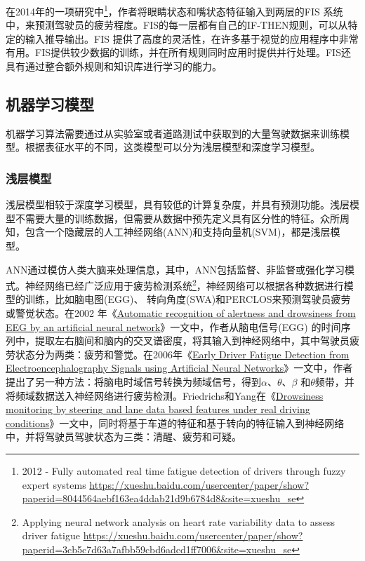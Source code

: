 在2014年的一项研究中\footnote{2012 - Fully automated real time
fatigue detection of drivers through fuzzy expert systems \quad \url{https://xueshu.baidu.com/usercenter/paper/show?paperid=8044564aebf163ea4ddab21d9b6784d8&site=xueshu_se}}，作者将眼睛状态和嘴状态特征输入到两层的FIS 系统中，来预测驾驶员的疲劳程度。FIS的每一层都有自己的IF-THEN规则，可以从特定的输入推导输出。FIS 提供了高度的灵活性，在许多基于视觉的应用程序中非常有用。FIS提供较少数据的训练，并在所有规则同时应用时提供并行处理。FIS还具有通过整合额外规则和知识库进行学习的能力。



\subsection{机器学习模型}
机器学习算法需要通过从实验室或者道路测试中获取到的大量驾驶数据来训练模型。根据表征水平的不同，这类模型可以分为浅层模型和深度学习模型。

\subsubsection{浅层模型}

浅层模型相较于深度学习模型，具有较低的计算复杂度，并具有预测功能。浅层模型不需要大量的训练数据，但需要从数据中预先定义具有区分性的特征。众所周知，包含一个隐藏层的人工神经网络(ANN)和支持向量机(SVM)，都是浅层模型。

ANN通过模仿人类大脑来处理信息，其中，ANN包括监督、非监督或强化学习模式。神经网络已经广泛应用于疲劳检测系统\footnote{Applying neural
network analysis on heart rate variability data to assess driver fatigue \quad \url{https://xueshu.baidu.com/usercenter/paper/show?paperid=3cb5c7d63a7afbb59cbd6adcd1ff7006&site=xueshu_se}}，神经网络可以根据各种数据进行模型的训练，比如脑电图(EGG)、 转向角度(SWA)和PERCLOS来预测驾驶员疲劳或警觉状态。在2002 年《\href{https://xueshu.baidu.com/usercenter/paper/show?paperid=283463e03da84178acd0dca1591bb0ea&site=xueshu_se&hitarticle=1}{Automatic
recognition of alertness and drowsiness from EEG by an artificial neural network}》一文中，作者从脑电信号(EGG) 的时间序列中，提取左右脑间和脑内的交叉谱密度，将其输入到神经网络中，其中驾驶员疲劳状态分为两类：疲劳和警觉。在2006年《\href{https://xueshu.baidu.com/usercenter/paper/show?paperid=8b2148521959fcd0f7678e4f703e4b76&site=xueshu_se}{Early Driver Fatigue Detection from Electroencephalography Signals using Artificial Neural Networks}》一文中，作者提出了另一种方法：将脑电时域信号转换为频域信号，得到$\alpha$、$\theta$、$\beta$ 和$\theta$频带，并将频域数据送入神经网络进行疲劳检测。Friedrichs和Yang在《\href{https://xueshu.baidu.com/usercenter/paper/show?paperid=2b397a7cad2d13149573e400b0a83398&site=xueshu_se&hitarticle=1}{Drowsiness monitoring by steering and lane
data based features under real driving conditions}》一文中，同时将基于车道的特征和基于转向的特征输入到神经网络中，并将驾驶员驾驶状态为三类：清醒、疲劳和可疑。


